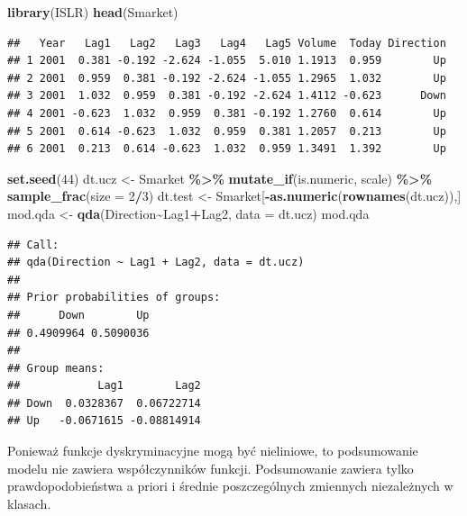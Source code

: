\documentclass[
]{book}
\newenvironment{Shaded}{\begin{snugshade}}{\end{snugshade}}
\newcommand{\AttributeTok}[1]{\textcolor[rgb]{0.13,0.29,0.53}{#1}}
\newcommand{\DecValTok}[1]{\textcolor[rgb]{0.00,0.00,0.81}{#1}}
\newcommand{\FunctionTok}[1]{\textcolor[rgb]{0.13,0.29,0.53}{\textbf{#1}}}
\newcommand{\NormalTok}[1]{#1}
\newcommand{\OtherTok}[1]{\textcolor[rgb]{0.56,0.35,0.01}{#1}}
\newcommand{\SpecialCharTok}[1]{\textcolor[rgb]{0.81,0.36,0.00}{\textbf{#1}}}
\theoremstyle{plain}
\theoremstyle{definition}
\theoremstyle{definition}
\theoremstyle{definition}
\theoremstyle{definition}
\theoremstyle{definition}
\theoremstyle{remark}
\begin{document}
\begin{Shaded}
\begin{Highlighting}[]
\FunctionTok{library}\NormalTok{(ISLR)}
\FunctionTok{head}\NormalTok{(Smarket)}
\end{Highlighting}
\end{Shaded}

\begin{verbatim}
##   Year   Lag1   Lag2   Lag3   Lag4   Lag5 Volume  Today Direction
## 1 2001  0.381 -0.192 -2.624 -1.055  5.010 1.1913  0.959        Up
## 2 2001  0.959  0.381 -0.192 -2.624 -1.055 1.2965  1.032        Up
## 3 2001  1.032  0.959  0.381 -0.192 -2.624 1.4112 -0.623      Down
## 4 2001 -0.623  1.032  0.959  0.381 -0.192 1.2760  0.614        Up
## 5 2001  0.614 -0.623  1.032  0.959  0.381 1.2057  0.213        Up
## 6 2001  0.213  0.614 -0.623  1.032  0.959 1.3491  1.392        Up
\end{verbatim}

\begin{Shaded}
\begin{Highlighting}[]
\FunctionTok{set.seed}\NormalTok{(}\DecValTok{44}\NormalTok{)}
\NormalTok{dt.ucz }\OtherTok{\textless{}{-}}\NormalTok{ Smarket }\SpecialCharTok{\%\textgreater{}\%} 
    \FunctionTok{mutate\_if}\NormalTok{(is.numeric, scale) }\SpecialCharTok{\%\textgreater{}\%} 
    \FunctionTok{sample\_frac}\NormalTok{(}\AttributeTok{size =} \DecValTok{2}\SpecialCharTok{/}\DecValTok{3}\NormalTok{) }
\NormalTok{dt.test }\OtherTok{\textless{}{-}}\NormalTok{ Smarket[}\SpecialCharTok{{-}}\FunctionTok{as.numeric}\NormalTok{(}\FunctionTok{rownames}\NormalTok{(dt.ucz)),]}
\NormalTok{mod.qda }\OtherTok{\textless{}{-}} \FunctionTok{qda}\NormalTok{(Direction}\SpecialCharTok{\textasciitilde{}}\NormalTok{Lag1}\SpecialCharTok{+}\NormalTok{Lag2, }\AttributeTok{data =}\NormalTok{ dt.ucz)}
\NormalTok{mod.qda}
\end{Highlighting}
\end{Shaded}

\begin{verbatim}
## Call:
## qda(Direction ~ Lag1 + Lag2, data = dt.ucz)
## 
## Prior probabilities of groups:
##      Down        Up 
## 0.4909964 0.5090036 
## 
## Group means:
##            Lag1        Lag2
## Down  0.0328367  0.06722714
## Up   -0.0671615 -0.08814914
\end{verbatim}

Ponieważ funkcje dyskryminacyjne mogą być nieliniowe, to podsumowanie modelu nie zawiera współczynników funkcji. Podsumowanie zawiera tylko prawdopodobieństwa a priori i średnie poszczególnych zmiennych niezależnych w klasach.
\end{document}
